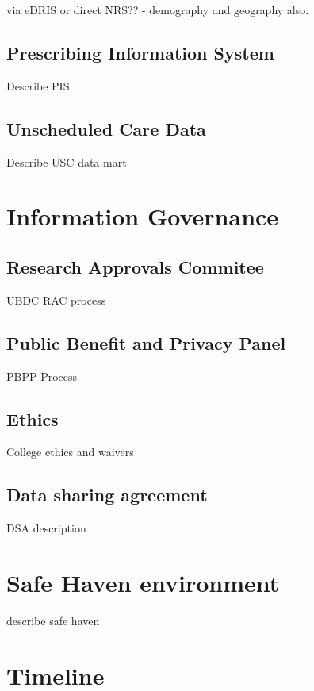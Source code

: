 \documentclass[12pt,]{report}
\begin{document}
via eDRIS or direct NRS?? - demography and geography also.

\subsection{Prescribing Information System}

Describe PIS

\subsection{Unscheduled Care Data}

Describe USC data mart

\section{Information Governance}\label{sec:ig}

\subsection{Research Approvals Commitee}\label{subsec:rac}

UBDC RAC process

\subsection{Public Benefit and Privacy Panel}\label{subsec:pbpp}

PBPP Process

\subsection{Ethics}\label{subsec:ethics}

College ethics and waivers

\subsection{Data sharing agreement}\label{subsec:dsa}

DSA description

\section{Safe Haven environment}\label{sec:safe-haven}

describe safe haven

\section{Timeline}\label{sec:timeline}
\end{document}
